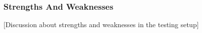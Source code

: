 \subsubsection{Strengths And Weaknesses}\label{Testing:About:Strengths}
	[Discussion about strengths and weaknesses in the testing setup]
